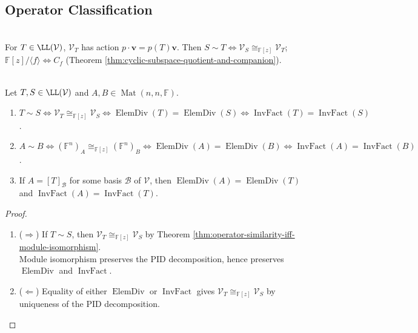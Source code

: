 \subsection{Operator Classification}

\begin{perspective} \label{per:operator-module-similarity-dictionary} \\
For $T\in\LL(\mathcal{V})$, $\mathcal{V}_T$ has action $p\cdot\mathbf{v}=p(T)\mathbf{v}$. Then $S\sim T\Longleftrightarrow\mathcal{V}_S\cong_{\mathbb{F}[z]}\mathcal{V}_T$; $\mathbb{F}[z]/\langle f\rangle\Longleftrightarrow C_f$ (Theorem \ref{thm:cyclic-subspace-quotient-and-companion}).
\end{perspective}

\begin{theorem} \label{thm:elementary-divisors-complete-similarity-invariant} \\
Let $T,S\in\LL(\mathcal{V})$ and $A,B\in\operatorname{Mat}(n,n,\mathbb{F})$.
\begin{enumerate}[label=(\roman*)]
\setlength{\itemsep}{0pt}
\item $T\sim S\Longleftrightarrow\mathcal{V}_T\cong_{\mathbb{F}[z]}\mathcal{V}_S\Longleftrightarrow\operatorname{ElemDiv}(T)=\operatorname{ElemDiv}(S)\Longleftrightarrow\operatorname{InvFact}(T)=\operatorname{InvFact}(S)$.
\item $A\sim B\Longleftrightarrow(\mathbb{F}^n)_A\cong_{\mathbb{F}[z]}(\mathbb{F}^n)_B\Longleftrightarrow\operatorname{ElemDiv}(A)=\operatorname{ElemDiv}(B)\Longleftrightarrow\operatorname{InvFact}(A)=\operatorname{InvFact}(B)$.
\item If $A=[T]_{\mathcal{B}}$ for some basis $\mathcal{B}$ of $\mathcal{V}$, then $\operatorname{ElemDiv}(A)=\operatorname{ElemDiv}(T)$ and $\operatorname{InvFact}(A)=\operatorname{InvFact}(T)$.
\end{enumerate}
\begin{proof}
\begin{enumerate}[label=(\roman*).]
\setlength{\itemsep}{0pt}
\item[$(i)$]($\Rightarrow$) If $T\sim S$, then $\mathcal{V}_T\cong_{\mathbb{F}[z]}\mathcal{V}_S$ by Theorem \ref{thm:operator-similarity-iff-module-isomorphism}.\\
Module isomorphism preserves the PID decomposition, hence preserves $\operatorname{ElemDiv}$ and $\operatorname{InvFact}$.
\item[$(i)$]($\Leftarrow$) Equality of either $\operatorname{ElemDiv}$ or $\operatorname{InvFact}$ gives $\mathcal{V}_T\cong_{\mathbb{F}[z]}\mathcal{V}_S$ by uniqueness of the PID decomposition.\\

\end{enumerate}
\end{proof}
\end{theorem}
